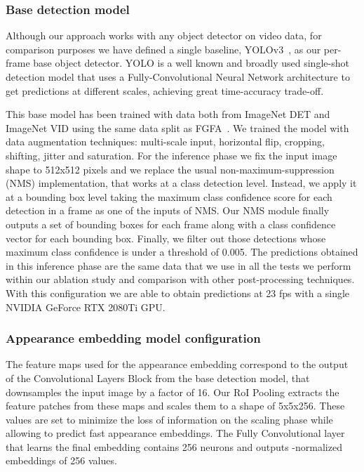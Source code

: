 \documentclass[letterpaper, 10 pt, conference]{ieeeconf}
\begin{document}
\subsubsection{Base detection model} 
\label{sec:base_det_model}



Although our approach works with any object detector on video data, for comparison purposes we have defined a single baseline, YOLOv3~\cite{redmon2018yolov3}, as our per-frame base object detector.
YOLO is a well known and broadly used single-shot detection model that uses a Fully-Convolutional Neural Network architecture to get predictions at different scales, achieving great time-accuracy trade-off.

This base model has been trained with data both from ImageNet DET and ImageNet VID using the same data split as FGFA~\cite{Zhu_2017_ICCV}. We trained the model with data augmentation techniques:  multi-scale input, horizontal flip, cropping, shifting, jitter and saturation. For the inference phase we fix the input image shape to 512x512 pixels and we replace the usual non-maximum-suppression (NMS) implementation, that works at a class detection level. Instead, we apply it at a bounding box level taking the maximum class confidence score for each detection in a frame as one of the inputs of NMS. Our NMS module finally outputs a set of bounding boxes for each frame along with a class confidence vector for each bounding box.
Finally, we filter out those detections whose maximum class confidence is under a threshold of 0.005. The predictions obtained in this inference phase are the same data that we use in all the tests we perform within our ablation study and comparison with other post-processing techniques. With this configuration we are able to obtain predictions at 23 fps with a single NVIDIA GeForce RTX 2080Ti GPU.




\subsubsection{Appearance embedding model configuration}
The feature maps used for the appearance embedding correspond to the output of the Convolutional Layers Block from the base detection model, that downsamples the input image by a factor of 16. Our RoI Pooling extracts the feature patches from these maps and scales them to a shape of 5x5x256. 
These values are set to minimize the loss of information on the scaling phase while allowing to predict fast appearance embeddings. The Fully Convolutional layer that learns the final embedding contains 256 neurons and outputs -normalized embeddings of 256 values.
\end{document}
